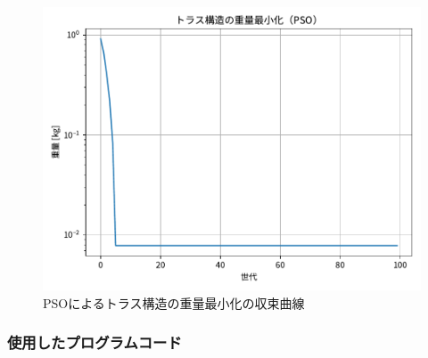 \begin{figure}[H]
  \centering
  \includegraphics[width=0.75\linewidth]{figure/Figure_7.pdf}
  \caption{PSOによるトラス構造の重量最小化の収束曲線}
  \label{fig:kadai7_result}
\end{figure}


\subsubsection{使用したプログラムコード}

